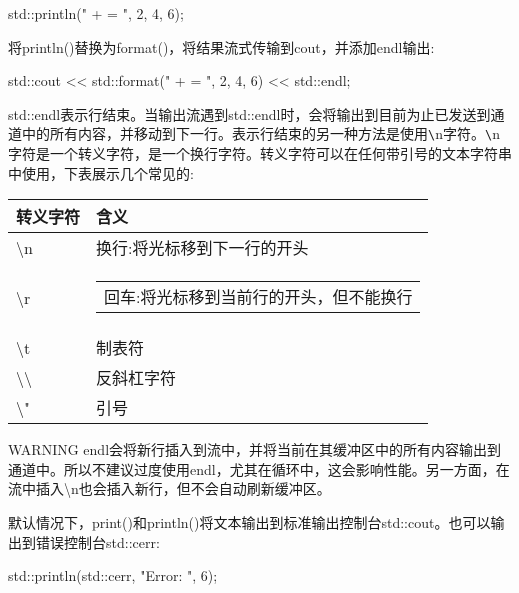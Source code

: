 \begin{cpp}
std::println("{} + {} = {}", 2, 4, 6);
\end{cpp}

将println()替换为format()，将结果流式传输到cout，并添加endl输出:

\begin{cpp}
std::cout << std::format("{} + {} = {}", 2, 4, 6) << std::endl;
\end{cpp}

std::endl表示行结束。当输出流遇到std::endl时，会将输出到目前为止已发送到通道中的所有内容，并移动到下一行。表示行结束的另一种方法是使用\verb|\|n字符。\verb|\|n字符是一个转义字符，是一个换行字符。转义字符可以在任何带引号的文本字符串中使用，下表展示几个常见的:

\begin{longtable}{|l|l|}
\hline
\textbf{转义字符}         & \textbf{含义}                                             \\ \hline
\endfirsthead
%
\endhead
%
\textbackslash{}n                & 换行:将光标移到下一行的开头 \\ \hline
\textbackslash{}r &
\begin{tabular}[c]{@{}l@{}}回车:将光标移到当前行的开头，但不能换行\end{tabular} \\ \hline
\textbackslash{}t                & 制表符                                                          \\ \hline
\textbackslash{}\textbackslash{} & 反斜杠字符                                          \\ \hline
\textbackslash{}"                & 引号                                               \\ \hline
\end{longtable}

\begin{myWarning}{WARNING}
endl会将新行插入到流中，并将当前在其缓冲区中的所有内容输出到通道中。所以不建议过度使用endl，尤其在循环中，这会影响性能。另一方面，在流中插入\textbackslash{}n也会插入新行，但不会自动刷新缓冲区。
\end{myWarning}

默认情况下，print()和println()将文本输出到标准输出控制台std::cout。也可以输出到错误控制台std::cerr:

\begin{cpp}
std::println(std::cerr, "Error: {}", 6);
\end{cpp}


